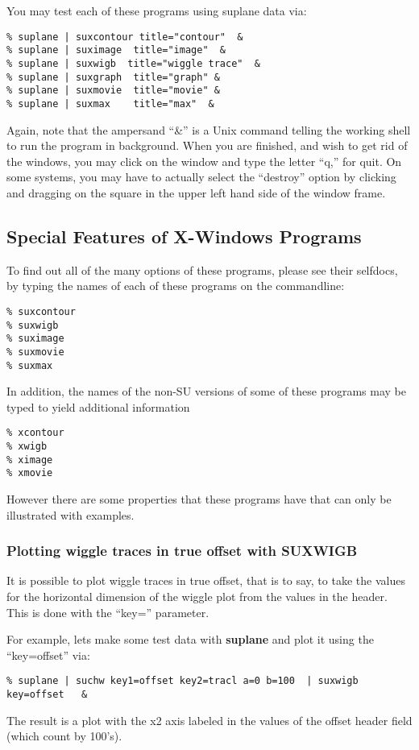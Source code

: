 {{{{{You may test each of these programs using suplane data via:
{\small\begin{verbatim}
% suplane | suxcontour title="contour"  &
% suplane | suximage  title="image"  &
% suplane | suxwigb  title="wiggle trace"  &
% suplane | suxgraph  title="graph" &
% suplane | suxmovie  title="movie" &
% suplane | suxmax    title="max"  &
\end{verbatim}}\noindent
Again, note that the ampersand ``\&'' is a Unix command
telling the working shell to run the program in background.
When you are finished, and wish to get rid of the windows,
you may click on the window and type the letter ``q,'' for quit.
On some systems, you may have to actually select the ``destroy''
option by clicking and dragging on the square in the upper left
hand side of the window frame.

\subsection{Special Features of X-Windows Programs}
To find out all of the many options of these programs, please
see their selfdocs, by typing the names of each of these programs
on the commandline:
{\small\begin{verbatim}
% suxcontour
% suxwigb
% suximage
% suxmovie
% suxmax
\end{verbatim}}\noindent

In addition, the names of the non-SU versions of some of these programs
may be typed to yield additional information
{\small\begin{verbatim}
% xcontour
% xwigb
% ximage
% xmovie
\end{verbatim}}\noindent

However there are some properties that these programs have that
can only be illustrated with examples.

\subsubsection{Plotting wiggle traces in true offset with SUXWIGB}
It is possible to plot wiggle traces in true offset, that is to
say, to take the values for the horizontal dimension of the wiggle
plot from the values in the header.
This is done with the ``key='' parameter.

For example, lets make some test data with {\bf suplane\/} and
plot it using the ``key=offset'' via:
{\small\begin{verbatim}
% suplane | suchw key1=offset key2=tracl a=0 b=100  | suxwigb key=offset   &
\end{verbatim}}\noindent
The result is a plot with the x2 axis labeled in the values of the offset
header field (which count by 100's).

}}}}}
